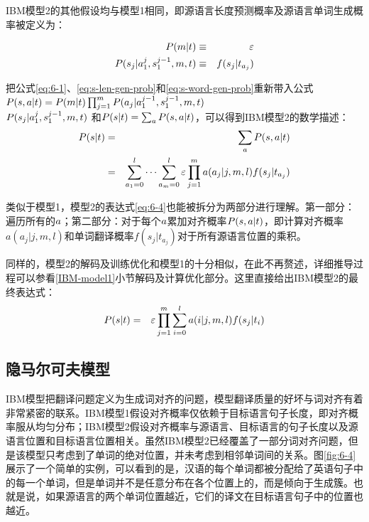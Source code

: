 \parinterval IBM模型2的其他假设均与模型1相同，即源语言长度预测概率及源语言单词生成概率被定义为：

\begin{eqnarray}
{P}(m|{t}) & \equiv & \varepsilon \label{eq:s-len-gen-prob} \\
{P}(s_j|a_1^{j},s_1^{j-1},m,{t}) & \equiv & f(s_j|t_{a_j})
\label{eq:s-word-gen-prob}
\end{eqnarray}

把公式\eqref{eq:6-1}、\eqref{eq:s-len-gen-prob}和\eqref{eq:s-word-gen-prob}重新带入公式${P}({s},{a}|{t})={P}(m|{t})\prod_{j=1}^{m}{{P}(a_j|a_1^{j-1},s_1^{j-1},m,{t})}$\\${{P}(s_j|a_1^{j},s_1^{j-1},m,{t})}$ 和${P}({s}|{t})= \sum_{{a}}{P}({s},{a}|{t})$，可以得到IBM模型2的数学描述：
\begin{eqnarray}
{P}({s}| {t}) & = &  \sum_{{a}}{{P}({s},{a}| {t})} \nonumber \\
                       & = & \sum_{a_1=0}^{l}{\cdots}\sum _{a_m=0}^{l}{\varepsilon}\prod_{j=1}^{m}{a(a_j|j,m,l)f(s_j|t_{a_j})}
\label{eq:6-4}
\end{eqnarray}

\parinterval 类似于模型1，模型2的表达式\eqref{eq:6-4}也能被拆分为两部分进行理解。第一部分：遍历所有的${a}$；第二部分：对于每个${a}$累加对齐概率${P}({s},{a}| {t})$，即计算对齐概率$a(a_j|j,m,l)$和单词翻译概率$f(s_j|t_{a_j})$对于所有源语言位置的乘积。

\parinterval 同样的，模型2的解码及训练优化和模型1的十分相似，在此不再赘述，详细推导过程可以参看{\chapterfive}\ref{IBM-model1}小节解码及计算优化部分。这里直接给出IBM模型2的最终表达式：
\begin{eqnarray}
{P}({s}| {t}) & = & \varepsilon \prod\limits_{j=1}^{m} \sum\limits_{i=0}^{l} a(i|j,m,l) f(s_j|t_i)
\label{eq:6-5}
\end{eqnarray}



\subsection{隐马尔可夫模型}

\parinterval IBM模型把翻译问题定义为生成词对齐的问题，模型翻译质量的好坏与词对齐有着非常紧密的联系。IBM模型1假设对齐概率仅依赖于目标语言句子长度，即对齐概率服从均匀分布；IBM模型2假设对齐概率与源语言、目标语言的句子长度以及源语言位置和目标语言位置相关。虽然IBM模型2已经覆盖了一部分词对齐问题，但是该模型只考虑到了单词的绝对位置，并未考虑到相邻单词间的关系。图\ref{fig:6-4} 展示了一个简单的实例，可以看到的是，汉语的每个单词都被分配给了英语句子中的每一个单词，但是单词并不是任意分布在各个位置上的，而是倾向于生成簇。也就是说，如果源语言的两个单词位置越近，它们的译文在目标语言句子中的位置也越近。

